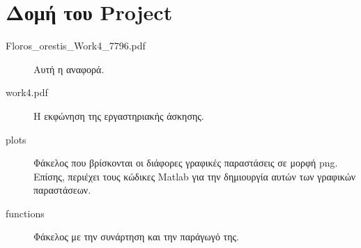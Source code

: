 \chapter*{Δομή του Project} \label{project-structure}

\begin{description}
	\item[Floros\_orestis\_Work4\_7796.pdf] Αυτή η αναφορά.
	\item[work4.pdf] Η εκφώνηση της εργαστηριακής άσκησης.
	\item[plots] Φάκελος που βρίσκονται οι διάφορες γραφικές παραστάσεις σε μορφή png. Επίσης, περιέχει τους κώδικες Matlab για την δημιουργία αυτών των γραφικών παραστάσεων.
	\item[functions] Φάκελος με την συνάρτηση και την παράγωγό της.
\end{description}










